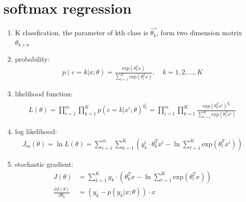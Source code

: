 \documentclass[12pt]{ctexart}%
\begin{document}
	\section{\quad softmax regression}
		\begin{enumerate}
			\item K classfication, the parameter of kth class  is $\vec{\theta_k}$, form two dimension matrix $\theta_{k \times n}$
			
			\item probability: 
				\begin{align}
					p(c=k|x;\theta) = \frac{\text{exp}(\theta_k^T x)}{\sum_{l=1}^{K}\text{exp}(\theta_l^T x)}, \quad k=1,2,...,K
				\end{align}
				
			\item likelihood function:
				\begin{align}
					L(\theta) = \prod_{i=1}^{m}\prod_{k=1}^{K}p(c=k|x^i; \theta)^{y_k^i} = \prod_{i=1}^{m}\prod_{k=1}^{K}\frac{\text{exp}(\theta_k^T x^i)^{y_k^i}}{\sum_{l=1}^{K}\text{exp}(\theta_l^T x^i)}
				\end{align}
				
			\item log likelihood:
				\begin{align}
					J_m(\theta) = \ln L(\theta) = \sum_{i=1}^{m}\sum_{k=1}^{K}\left( y_k^i \cdot \theta_k^T x^i - \ln \sum_{l=1}^{K}\text{exp}(\theta_l^T x^i)\right)
				\end{align}
				
			\item stochastic gradient:
				\begin{align}
					J(\theta) &= \sum_{k=1}^{K}y_k \cdot \left( \theta_k^T x - \ln \sum_{l=1}^{K} \text{exp}(\theta_l^T x)\right)\\
					\frac{\partial J(\theta)}{\partial \theta_k} &= \left( y_k - p(y_k|x;\theta) \right) \cdot x
				\end{align}
		\end{enumerate}
\end{document}
